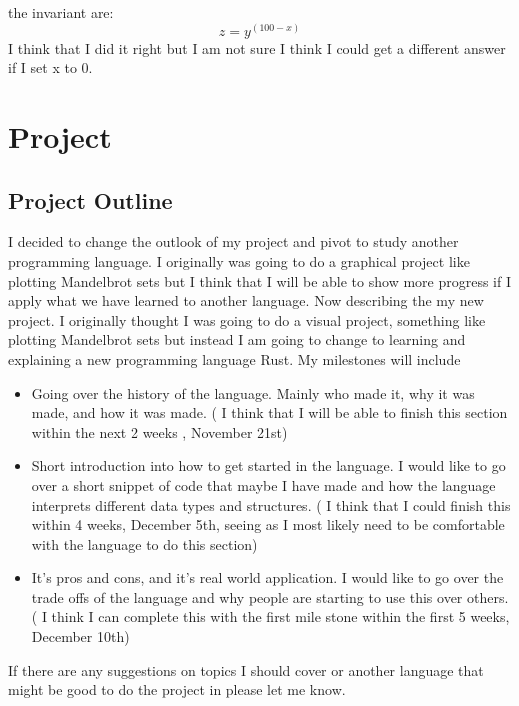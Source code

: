 \documentclass{article}
\theoremstyle{theorem}
\theoremstyle{definition}
\theoremstyle{remark}
\begin{document}
  the invariant are: \[ z =  y^(100-x) \]
I think that I did it right but I am not sure I think I could get a different answer if I set x to 0.
\section{Project}\label{Project}
\subsection{Project Outline }
I decided to change the outlook of my project and pivot to study another programming language. I originally was going to do a graphical project like plotting Mandelbrot sets but I think that I will be able to show more progress if I apply what we have learned to another language. 
    Now describing the my new project. I originally thought I was going to do a visual project, something like plotting Mandelbrot sets but instead I am going to change to learning and explaining a new programming language Rust. My milestones will include 
    \begin{itemize}

\item Going over the history of the language. Mainly who made it, why it was made, and how it was made. ( I think that I will be able to finish this section within the next 2 weeks , November 21st) 
\item Short introduction into how to get started in the language. I would like to go over a short snippet of code that maybe I have made and how the language interprets different data types and structures. ( I think that I could finish this within 4 weeks, December 5th, seeing as I most likely need to be comfortable with the language to do this section)
\item It’s pros and cons, and it's real world application. I would like to go over the trade offs of the language and why people are starting to use this over others. ( I think I can complete this with the first mile stone within the first 5 weeks, December 10th)
\end{itemize}
If there are any suggestions on topics I should cover or another language that might be good to do the project in please let me know.
\end{document}
